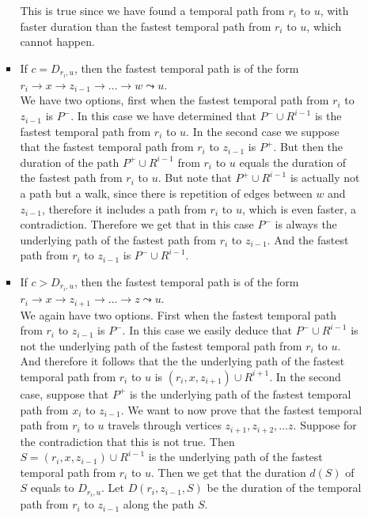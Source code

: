 \documentclass[a4paper,UKenglish,cleveref, autoref, thm-restate, anonymous]{lipics-v2021}
\begin{document}
\begin{enumerate}[(i)]
\begin{enumerate}[(a)]
\begin{itemize}
            This is true since we have found a temporal path from $r_i$ to $u$, with faster duration than the fastest temporal path from $r_i$ to $u$,
            which cannot happen.
            \item  If $c = D_{r_i,u}$, then 
            the fastest temporal path is of the form $r_i \rightarrow x \rightarrow z_{i-1} \rightarrow \dots \rightarrow w \leadsto u$.\\
            We have two options, first when the fastest temporal path from $r_i$ to $z_{i-1}$ is $P^-$.
            In this case we have determined that $P^- \cup R^{i-1}$ is the fastest temporal path from $r_i$ to $u$.
            In the second case we suppose that the fastest temporal path from $r_i$ to $z_{i-1}$ is $P^+$.
            But then the duration of the path $P^+ \cup R^{i-1}$ from $r_i$ to $u$ equals the duration of the fastest path from $r_i$ to $u$. But note that $P^+ \cup R^{i-1}$ is actually not a path but a walk, since there is repetition of edges between $w$ and $z_{i-1}$,
            therefore it includes a path from $r_i$ to $u$, which is even faster,
            a contradiction.
            Therefore we get that in this case $P^-$ is always the underlying path of the fastest path from $r_i$ to $z_{i-1}$.
            And the fastest path from $r_i$ to $z_{i-1}$ is $P^- \cup R^{i-1}$.
            \item If $c > D_{r_i,u}$, then 
            the fastest temporal path is of the form $r_i \rightarrow x \rightarrow z_{i+1} \rightarrow \dots \rightarrow z \leadsto u$.\\
            We again have two options.
            First when the fastest temporal path from $r_i$ to $z_{i-1}$ is $P^-$.
            In this case we easily deduce that $P^- \cup R^{i-1}$ is not the underlying path of the fastest temporal path from $r_i$ to $u$.
            And therefore it follows that the the underlying path of the fastest temporal path from $r_i$ to $u$ is  $(r_i, x, z_{i+1}) \cup R^{i+1}$.
            In the second case, suppose that $P^+$ is the underlying path of the fastest temporal path from $x_i$ to $z_{i-1}$.
            We want to now prove that the fastest temporal path from $r_i$ to $u$ travels through vertices $z_{i+1}, z_{i+2}, \dots z$.
            Suppose for the contradiction that this is not true. 
            Then $S = (r_i, x, z_{i-1}) \cup R^{i-1}$ is the underlying path of the fastest temporal path from $r_i$ to $u$.
            Then we get that the duration $d(S)$ of $S$ equals to $D_{r_i,u}$.
            Let $D(r_i,z_{i-1},S)$ be the duration of the temporal path from $r_i$ to $z_{i-1}$ along the path $S$.

\end{itemize}
\end{enumerate}
\end{enumerate}
\end{document}
